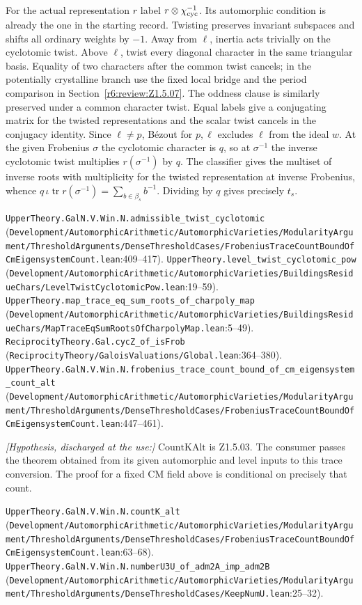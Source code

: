 For the actual representation $r$ label $r\otimes\chi_{\rm cyc}^{-1}$. Its automorphic condition is already the one in the starting record. Twisting preserves invariant subspaces and shifts all ordinary weights by $-1$. Away from $\ell$, inertia acts trivially on the cyclotomic twist. Above $\ell$, twist every diagonal character in the same triangular basis. Equality of two characters after the common twist cancels; in the potentially crystalline branch use the fixed local bridge and the period comparison in Section~\ref{r6:review:Z1.5.07}. The oddness clause is similarly preserved under a common character twist. Equal labels give a conjugating matrix for the twisted representations and the scalar twist cancels in the conjugacy identity. Since $\ell\ne p$, B\'ezout for $p,\ell$ excludes $\ell$ from the ideal $w$. At the given Frobenius $\sigma$ the cyclotomic character is $q$, so at $\sigma^{-1}$ the inverse cyclotomic twist multiplies $r(\sigma^{-1})$ by $q$. The classifier gives the multiset of inverse roots with multiplicity for the twisted representation at inverse Frobenius, whence $q\,\iota\operatorname{tr}r(\sigma^{-1})=\sum_{b\in\beta_s}b^{-1}$. Dividing by $q$ gives precisely $t_s$.
\par{\footnotesize \nolinkurl{UpperTheory.GalN.V.Win.N.admissible_twist_cyclotomic} (\nolinkurl{Development/AutomorphicArithmetic/AutomorphicVarieties/ModularityArgument/ThresholdArguments/DenseThresholdCases/FrobeniusTraceCountBoundOfCmEigensystemCount.lean}\allowbreak:409--417). \nolinkurl{UpperTheory.level_twist_cyclotomic_pow} (\nolinkurl{Development/AutomorphicArithmetic/AutomorphicVarieties/BuildingsResidueChars/LevelTwistCyclotomicPow.lean}\allowbreak:19--59). \nolinkurl{UpperTheory.map_trace_eq_sum_roots_of_charpoly_map} (\nolinkurl{Development/AutomorphicArithmetic/AutomorphicVarieties/BuildingsResidueChars/MapTraceEqSumRootsOfCharpolyMap.lean}\allowbreak:5--49). \nolinkurl{ReciprocityTheory.Gal.cycZ_of_isFrob} (\nolinkurl{ReciprocityTheory/GaloisValuations/Global.lean}\allowbreak:364--380). \nolinkurl{UpperTheory.GalN.V.Win.N.frobenius_trace_count_bound_of_cm_eigensystem_count_alt} (\nolinkurl{Development/AutomorphicArithmetic/AutomorphicVarieties/ModularityArgument/ThresholdArguments/DenseThresholdCases/FrobeniusTraceCountBoundOfCmEigensystemCount.lean}\allowbreak:447--461).\par}

\textit{[Hypothesis, discharged at the use:]} $\mathrm{CountKAlt}$ is Z1.5.03. The consumer passes the theorem obtained from its given automorphic and level inputs to this trace conversion. The proof for a fixed CM field above is conditional on precisely that count.
\par{\footnotesize \nolinkurl{UpperTheory.GalN.V.Win.N.countK_alt} (\nolinkurl{Development/AutomorphicArithmetic/AutomorphicVarieties/ModularityArgument/ThresholdArguments/DenseThresholdCases/FrobeniusTraceCountBoundOfCmEigensystemCount.lean}\allowbreak:63--68). \nolinkurl{UpperTheory.GalN.V.Win.N.numberU3U_of_adm2A_imp_adm2B} (\nolinkurl{Development/AutomorphicArithmetic/AutomorphicVarieties/ModularityArgument/ThresholdArguments/DenseThresholdCases/KeepNumU.lean}\allowbreak:25--32).\par}

